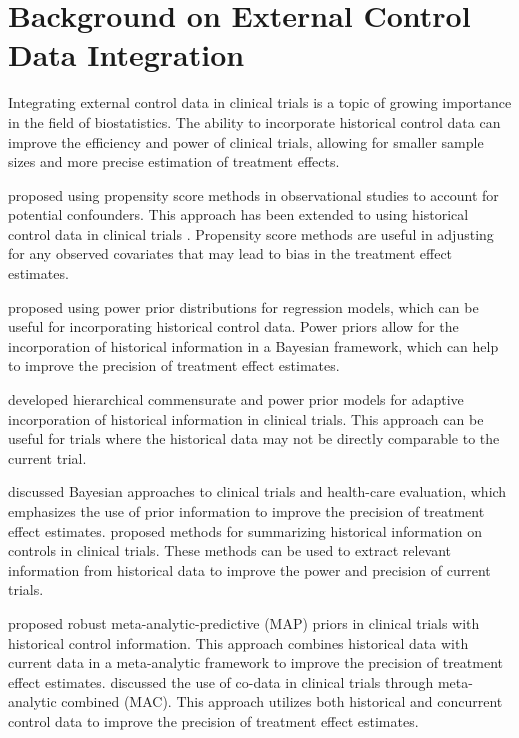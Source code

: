 \section{Background on External Control Data Integration}
Integrating external control data in clinical trials is a topic of growing importance in the field of biostatistics. The ability to incorporate historical control data can improve the efficiency and power of clinical trials, allowing for smaller sample sizes and more precise estimation of treatment effects.

\cite{rosenbaum1983central} proposed using propensity score methods in observational studies to account for potential confounders. This approach has been extended to using historical control data in clinical trials \citep{viele2014use, pocock1976combination}. Propensity score methods are useful in adjusting for any observed covariates that may lead to bias in the treatment effect estimates.

\cite{ibrahim2000power} proposed using power prior distributions for regression models, which can be useful for incorporating historical control data. Power priors allow for the incorporation of historical information in a Bayesian framework, which can help to improve the precision of treatment effect estimates.

\cite{hobbs2011hierarchical} developed hierarchical commensurate and power prior models for adaptive incorporation of historical information in clinical trials. This approach can be useful for trials where the historical data may not be directly comparable to the current trial.

\cite{spiegelhalter2004bayesian} discussed Bayesian approaches to clinical trials and health-care evaluation, which emphasizes the use of prior information to improve the precision of treatment effect estimates. \cite{neuenschwander2010summarizing} proposed methods for summarizing historical information on controls in clinical trials. These methods can be used to extract relevant information from historical data to improve the power and precision of current trials.

\cite{schmidli2014robust} proposed robust meta-analytic-predictive (MAP) priors in clinical trials with historical control information. This approach combines historical data with current data in a meta-analytic framework to improve the precision of treatment effect estimates. \cite{neuenschwander2016use} discussed the use of co-data in clinical trials through meta-analytic combined (MAC). This approach utilizes both historical and concurrent control data to improve the precision of treatment effect estimates.

